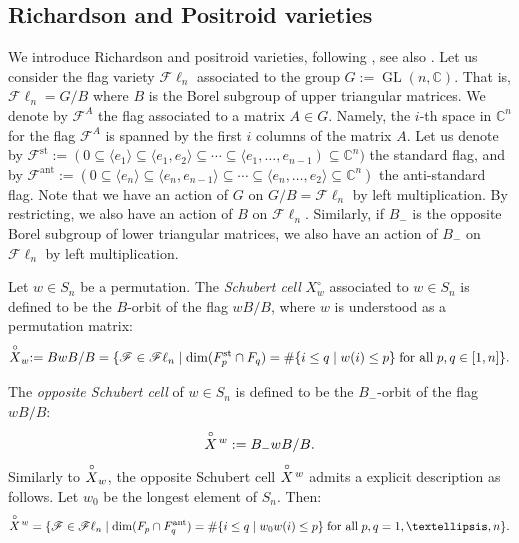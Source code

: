 \documentclass[10pt]{amsart}
\theoremstyle{plain}
\theoremstyle{definition}
\theoremstyle{remark}
\numberwithin{equation}{section}
\newcommand{\C}{\mathbb{C}}
\newcommand{\GL}{\operatorname{GL}}
\newcommand{\std}{\text{st}}
\newcommand{\bC}{\mathbb{C}}
\renewcommand{\C}{\mathbb{C}}
\newcommand{\cF}{\mathscr{F}}
\newcommand{\Fl}{\mathscr{F}\ell}
\newcommand{\schub}{\buildrel\circ \over X}
\DeclareMathOperator{\ant}{ant}
\newcommand{\MG}[1]{{\color{teal}{{\bf Misha}: #1}}}
\begin{document}

\subsection{Richardson and Positroid varieties} We introduce Richardson and positroid varieties, following \cite{KLS}, see also \cite{SpeyerSurvey}. Let us consider the flag variety $\Fl_{n}$ associated to the group $G := \GL(n,\bC)$. That is, $\Fl_{n} = G/B$ where $B$ is the Borel subgroup of upper triangular matrices. We denote by $\cF^{A}$ the flag associated to a matrix $A \in G$. Namely, the $i$-th space in $\C^n$ for the flag $\cF^{A}$ is spanned by the first $i$ columns of the matrix $A$. Let us denote by $\cF^{\std} := (0 \subseteq \langle e_{1} \rangle \subseteq \langle e_{1}, e_{2}\rangle \subseteq \cdots \subseteq \langle e_{1}, \dots, e_{n-1}) \subseteq \bC^{n})$ the standard flag, and by $\cF^{\ant} := (0 \subseteq \langle e_{n}\rangle \subseteq \langle e_{n}, e_{n-1}\rangle \subseteq \cdots \subseteq \langle e_{n}, \dots, e_{2} \rangle \subseteq \bC^n)$ the anti-standard flag. Note that we have an action of $G$ on $G/B = \Fl_n$ by left multiplication. By restricting, we also have an action of $B$ on $\Fl_n$. Similarly, if $B_{-}$ is the opposite Borel subgroup of lower triangular matrices, we also have an action of $B_{-}$ on $\Fl_n$ by left multiplication.


Let $w \in S_n$ be a permutation. The \emph{Schubert cell} $X^{\circ}_{w}$ associated to $w\in S_n$ is defined to be the $B$-orbit of the flag $wB/B$, where $w$ is understood as a permutation matrix:
$$
\schub_{w} := BwB/B =  \{\cF \in \Fl_{n} \mid \dim(F^{\std}_{p} \cap F_{q}) = \#\{i \leq q \mid w(i) \leq p\} \; \text{for all} \; p, q\in[1,n]\}.
$$

The \emph{opposite Schubert cell} of $w \in S_n$ is defined to be the $B_{-}$-orbit of the flag $wB/B$:
\[
\schub\!^{w} := B_{-}wB/B.
\]
Similarly to $\schub_{w}$, the opposite Schubert cell $\schub\!^{w}$ admits a explicit description as follows. Let $w_{0}$ be the longest element of $S_{n}$. Then:
$$
\schub\!^{w} = \{\cF \in \Fl_{n} \mid \dim(F_{p}\cap F_{q}^{\ant}) = \#\{i \leq q \mid w_{0}w(i) \leq p\} \; \text{for all} \; p, q = 1, \dots, n\}.
$$
\end{document}
